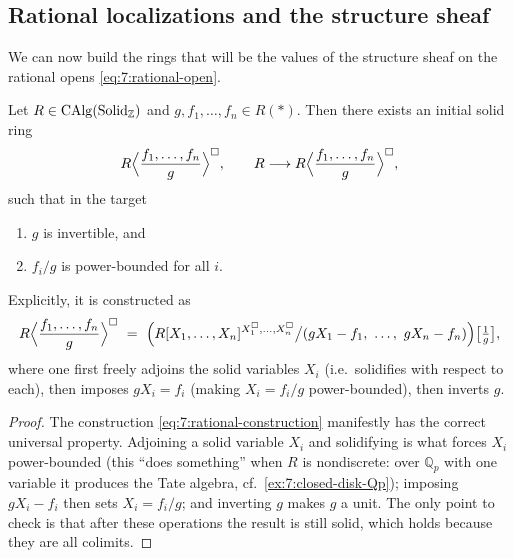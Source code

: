 \subsection{Rational localizations and the structure sheaf}

We can now build the rings that will be the values of the structure sheaf on
the rational opens \eqref{eq:7:rational-open}.

\begin{theorem}
\label{thm:7:rational-localization}
Let $R\in\operatorname{CAlg}(\mathrm{Solid}_{\mathbb{Z}})$ and $g,f_1,\dots,f_n\in R(\ast)$. Then
there exists an initial solid ring
\begin{equation*}
R\Bigl\langle\frac{f_1,\dots,f_n}{g}\Bigr\rangle^{\square},\qquad
R\longrightarrow R\Bigl\langle\frac{f_1,\dots,f_n}{g}\Bigr\rangle^{\square},
\end{equation*}
such that in the target
\begin{enumerate}
\item $g$ is invertible, and
\item $f_i/g$ is power-bounded for all $i$.
\end{enumerate}
Explicitly, it is constructed as
\begin{equation}
\label{eq:7:rational-construction}
R\Bigl\langle\frac{f_1,\dots,f_n}{g}\Bigr\rangle^{\square}\ =\
\Bigl(R[X_1,\dots,X_n]^{X_1^{\square},\dots,X_n^{\square}}\big/
(gX_1-f_1,\ \dots,\ gX_n-f_n)\Bigr)\bigl[\tfrac1g\bigr],
\end{equation}
where one first freely adjoins the solid variables $X_i$ (i.e.\ solidifies with
respect to each), then imposes $gX_i=f_i$ (making $X_i=f_i/g$ power-bounded),
then inverts $g$.
\end{theorem}

\begin{proof}
The construction \eqref{eq:7:rational-construction} manifestly has the correct
universal property. Adjoining a solid variable $X_i$ and solidifying is what
forces $X_i$ power-bounded (this ``does something'' when $R$ is nondiscrete:
over $\mathbb{Q}_p$ with one variable it produces the Tate algebra, cf.\
\cref{ex:7:closed-disk-Qp}); imposing $gX_i-f_i$ then sets $X_i=f_i/g$; and
inverting $g$ makes $g$ a unit. The only point to check is that after these
operations the result is still solid, which holds because they are all
colimits.
\end{proof}

